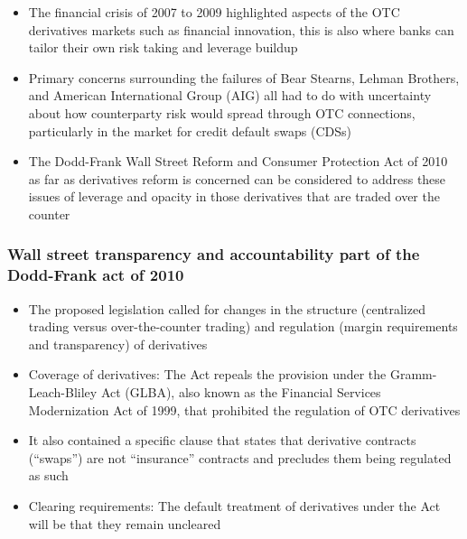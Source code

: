 \documentclass[11pt]{beamer}
\begin{document}
\begin{frame}
\begin{itemize}
\item The financial crisis of 2007 to 2009 highlighted aspects of the OTC derivatives markets such as financial innovation, this is also where banks can tailor their own risk taking and leverage buildup
\item Primary concerns surrounding the failures of Bear Stearns, Lehman Brothers, and American International Group (AIG) all had to do with uncertainty about how counterparty risk would spread through OTC connections, particularly in the market for credit default swaps (CDSs)
\item The Dodd-Frank Wall Street Reform and Consumer Protection Act of 2010 as far as derivatives reform is concerned can be considered to address these issues of leverage and opacity in those derivatives that are traded over the counter
\end{itemize}
\end{frame}

\begin{frame}
\frametitle{Wall street transparency and accountability part of the Dodd-Frank act of 2010}
\begin{itemize}
\item The proposed legislation called for changes in the structure (centralized trading versus over-the-counter trading) and regulation (margin requirements and transparency) of derivatives
\item Coverage of derivatives: The Act repeals the provision under the Gramm-Leach-Bliley Act (GLBA), also known as the Financial Services Modernization Act of 1999, that prohibited the regulation of OTC derivatives
\item It also contained a specific clause that states that derivative contracts (“swaps”) are not “insurance” contracts and precludes them being regulated as such
\item Clearing requirements: The default treatment of derivatives under the Act will be that they remain uncleared
\end{itemize}
\end{frame}
\end{document}
